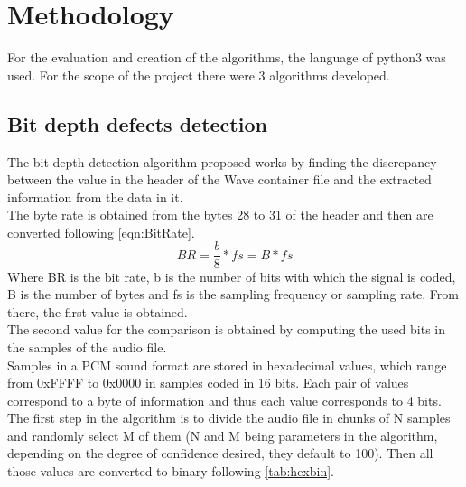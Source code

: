 \normallinespacing

\chapter{Methodology}

For the evaluation and creation of the algorithms, the language of python3 was used. For the scope of the project there were 3 algorithms developed. 

\section{Bit depth defects detection}

The bit depth detection algorithm proposed works by finding the discrepancy between the value in the header of the Wave container file and the 
extracted information from the data in it. \\
The byte rate is obtained from the bytes 28 to 31 of the header and then are converted following \ref{eqn:BitRate}.
\begin{equation}\label{eqn:BitRate}
BR=\frac{b}{8}*fs=B*fs
\end{equation} 
Where BR is the bit rate, b is the number of bits with which the signal is coded, B is the number of bytes and fs is the sampling frequency or 
sampling rate. From there, the first value is obtained.\\
The second value for the comparison is obtained by computing the used bits in the samples of the audio file.\\
Samples in a PCM sound format are stored in hexadecimal values, which range from 0xFFFF to 0x0000 in samples coded in 16 bits. Each pair of values 
correspond to a byte of information and thus each value corresponds to 4 bits. \\
The first step in the algorithm is to divide the audio file in chunks of N samples and randomly select M of them (N and M being parameters in the 
algorithm, depending on the degree of confidence desired, they default to 100). Then all those values are converted to binary following \ref{tab:hexbin}.
